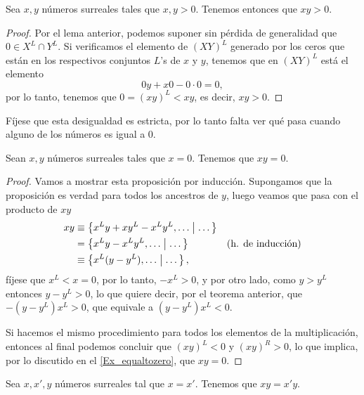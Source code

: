     \begin{theorem}
        Sea $x,y$ n\'umeros surreales tales que $x,y > 0$. Tenemos entonces que $xy>0$.
    \end{theorem}

    \begin{proof}
        Por el lema anterior, podemos suponer sin p\'erdida de generalidad que $0\in X^L\cap Y^L$. Si verificamos el elemento de $(XY)^L$ generado por los ceros que est\'an en los respectivos conjuntos $L$'s de $x$ y $y$, tenemos que en $(XY)^L$ est\'a el elemento
        \[
            0y + x0 - 0\cdot 0 = 0,
        \]
        por lo tanto, tenemos que $0 = (xy)^L < xy$, es decir, $xy > 0$.
    \end{proof}

    F\'ijese que esta desigualdad es estricta, por lo tanto falta ver qu\'e pasa cuando alguno de los n\'umeros es igual a $0$.
    
    \begin{theorem}
        Sean $x,y$ n\'umeros surreales tales que $x = 0$. Tenemos que $xy= 0$.
    \end{theorem}

    \begin{proof}
        Vamos a mostrar esta proposici\'on por inducci\'on. Supongamos que la proposici\'on es verdad para todos los ancestros de $y$, luego veamos que pasa con el producto de $xy$
        \begin{align*}
            xy & \equiv \left\{x^Ly + xy^L - x^Ly^L, \dots\;\middle|\; \dots\right\} & \\
                & = \left\{x^Ly - x^Ly^L,\dots\;\middle|\; \dots\right\} & \text{(h. de inducci\'on)}\\
                & \equiv \left\{x^L(y-y^L),\dots\;\middle|\; \dots\right\},
        \end{align*}
        f\'ijese que $x^L < x = 0$, por lo tanto, $-x^L > 0$, y por otro lado, como $y > y^L$ entonces $y - y^L > 0$, lo que quiere decir, por el teorema anterior, que $-(y-y^L)x^L > 0$, que equivale a $(y-y^L)x^L < 0$.

        Si hacemos el mismo procedimiento para todos los elementos de la multiplicaci\'on, entonces al final podemos concluir que $(xy)^L < 0$ y $(xy)^R > 0$, lo que implica, por lo discutido en el \ref*{Ex_equaltozero}, que $xy = 0$.
    \end{proof}

    \begin{corollary}[Compatibilidad con $=$]
        Sea $x,x',y$ n\'umeros surreales tal que $x = x'$. Tenemos que $xy = x'y$. 
    \end{corollary}

